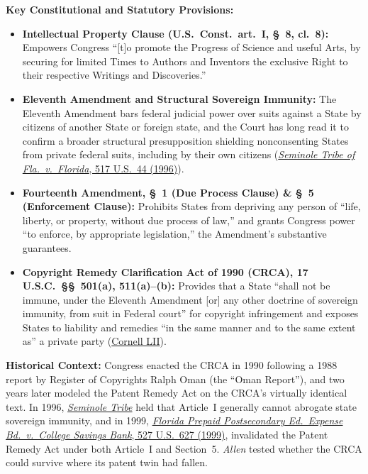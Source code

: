 \documentclass[12pt]{article}
\begin{document}
\textbf{Key Constitutional and Statutory Provisions:}
\begin{itemize}
  \item \textbf{Intellectual Property Clause (U.S.\ Const.\ art.\ I, \S~8, cl.\ 8):} Empowers Congress ``[t]o promote the Progress of Science and useful Arts, by securing for limited Times to Authors and Inventors the exclusive Right to their respective Writings and Discoveries.''
  \item \textbf{Eleventh Amendment and Structural Sovereign Immunity:} The Eleventh Amendment bars federal judicial power over suits against a State by citizens of another State or foreign state, and the Court has long read it to confirm a broader structural presupposition shielding nonconsenting States from private federal suits, including by their own citizens (\href{https://supreme.justia.com/cases/federal/us/517/44/}{\textit{Seminole Tribe of Fla.\ v.\ Florida}, 517 U.S.\ 44 (1996)}).
  \item \textbf{Fourteenth Amendment, \S~1 (Due Process Clause) \& \S~5 (Enforcement Clause):} Prohibits States from depriving any person of ``life, liberty, or property, without due process of law,'' and grants Congress power ``to enforce, by appropriate legislation,'' the Amendment's substantive guarantees.
  \item \textbf{Copyright Remedy Clarification Act of 1990 (CRCA), 17 U.S.C.\ \S\S~501(a), 511(a)--(b):} Provides that a State ``shall not be immune, under the Eleventh Amendment [or] any other doctrine of sovereign immunity, from suit in Federal court'' for copyright infringement and exposes States to liability and remedies ``in the same manner and to the same extent as'' a private party (\href{https://www.law.cornell.edu/supremecourt/text/18-877}{Cornell LII}).
\end{itemize}

\textbf{Historical Context:} Congress enacted the CRCA in 1990 following a 1988 report by Register of Copyrights Ralph Oman (the ``Oman Report''), and two years later modeled the Patent Remedy Act on the CRCA's virtually identical text. In 1996, \href{https://supreme.justia.com/cases/federal/us/517/44/}{\textit{Seminole Tribe}} held that Article~I generally cannot abrogate state sovereign immunity, and in 1999, \href{https://supreme.justia.com/cases/federal/us/527/627/}{\textit{Florida Prepaid Postsecondary Ed.\ Expense Bd.\ v.\ College Savings Bank}, 527 U.S.\ 627 (1999)}, invalidated the Patent Remedy Act under both Article~I and Section~5. \textit{Allen} tested whether the CRCA could survive where its patent twin had fallen.
\end{document}
